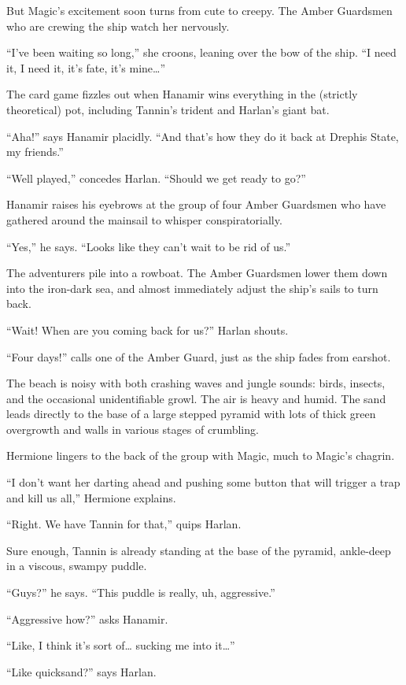 \documentclass[smalldemyvopaper,11pt,twoside,onecolumn,openright,extrafontsizes]{memoir}
\begin{document}
But Magic's excitement soon turns from cute to creepy. The Amber
Guardsmen who are crewing the ship watch her nervously.

``I've been waiting so long,'' she croons, leaning over the bow of the
ship. ``I need it, I need it, it's fate, it's mine\ldots{}''

The card game fizzles out when Hanamir wins everything in the (strictly
theoretical) pot, including Tannin's trident and Harlan's giant bat.

``Aha!'' says Hanamir placidly. ``And that's how they do it back at
Drephis State, my friends.''

``Well played,'' concedes Harlan. ``Should we get ready to go?''

Hanamir raises his eyebrows at the group of four Amber Guardsmen who
have gathered around the mainsail to whisper conspiratorially.

``Yes,'' he says. ``Looks like they can't wait to be rid of us.''

The adventurers pile into a rowboat. The Amber Guardsmen lower them down
into the iron-dark sea, and almost immediately adjust the ship's sails
to turn back.

``Wait! When are you coming back for us?'' Harlan shouts.

``Four days!'' calls one of the Amber Guard, just as the ship fades from
earshot.

The beach is noisy with both crashing waves and jungle sounds: birds,
insects, and the occasional unidentifiable growl. The air is heavy and
humid. The sand leads directly to the base of a large stepped pyramid
with lots of thick green overgrowth and walls in various stages of
crumbling.

Hermione lingers to the back of the group with Magic, much to Magic's
chagrin.

``I don't want her darting ahead and pushing some button that will
trigger a trap and kill us all,'' Hermione explains.

``Right. We have Tannin for that,'' quips Harlan.

Sure enough, Tannin is already standing at the base of the pyramid,
ankle-deep in a viscous, swampy puddle.

``Guys?'' he says. ``This puddle is really, uh, aggressive.''

``Aggressive how?'' asks Hanamir.

``Like, I think it's sort of\ldots{} sucking me into it\ldots{}''

``Like quicksand?'' says Harlan.
\end{document}
